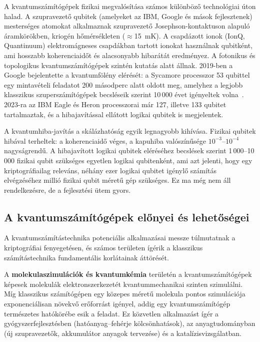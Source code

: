 A kvantumszámítógépek fizikai megvalósítása számos különböző technológiai úton halad. A szupravezető
qubitek (amelyeket az IBM, Google és mások fejlesztenek) mesterséges atomokat alkalmaznak
szupravezető Josephson-kontaktuson alapuló áramkörökben, kriogén hőmérsékleten ($\approx$15~mK).
A csapdázott ionok (IonQ, Quantinuum) elektromágneses csapdákban tartott ionokat használnak
qubitként, ami hosszabb koherenciaidőt és alacsonyabb hibarátát eredményez. A fotonikus és
topologikus kvantumszámítógépek szintén kutatás alatt állnak. 2019-ben a Google bejelentette a
kvantumfölény elérését: a Sycamore processzor 53 qubittel egy mintavételi feladatot 200 másodperc
alatt oldott meg, amelyhez a legjobb klasszikus szuperszámítógépek becsléseik szerint 10\,000 évet
igényeltek volna~\cite{google_supremacy_2019}. 2023-ra az IBM Eagle és Heron processzorai már 127,
illetve 133 qubitet tartalmaztak, és a hibajavítással ellátott logikai qubitek is megjelentek.

A kvantumhiba-javítás a skálázhatóság egyik legnagyobb kihívása. Fizikai qubitek hibával terheltek:
a koherenciaidő véges, a kapuhiba valószínűsége $10^{-3}$--$10^{-4}$ nagyságrendű. A hibajavított
logikai qubitek eléréséhez becslések szerint 1\,000--10\,000 fizikai qubit szükséges egyetlen
logikai qubitenként, ami azt jelenti, hogy egy kriptográfiailag releváns, néhány ezer logikai
qubitet igénylő számítás elvégzéséhez millió fizikai qubit méretű gép szükséges. Ez ma még nem
áll rendelkezésre, de a fejlesztési ütem gyors.

\subsection{A kvantumszámítógépek előnyei és lehetőségei}

A kvantumszámítástechnika potenciális alkalmazásai messze túlmutatnak a kriptográfiai fenyegetésen,
és számos területen ígérik a klasszikus számítástechnika fundamentális korlátainak áttörését.

A \textbf{molekulaszimulációk és kvantumkémia} területén a kvantumszámítógépek képesek
molekulák elektronszerkezetét kvantummechanikai szinten szimulálni. Míg klasszikus számítógépen
egy közepes méretű molekula pontos szimulációja exponenciálisan növekvő erőforrást igényel,
addig egy kvantumszámítógép természetes hatókörébe esik a feladat. Ez közvetlen alkalmazást ígér
a gyógyszerfejlesztésben (hatóanyag--fehérje kölcsönhatások), az anyagtudományban (új szupravezetők,
akkumulátor anyagok tervezése) és a katalízisvizsgálatban.

